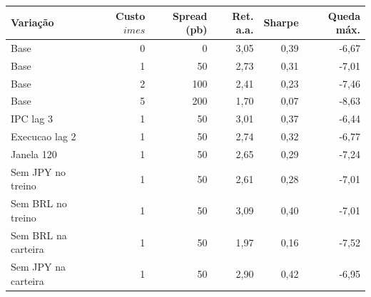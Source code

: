 \begin{tabular}{lrrrrr}
\toprule
Variação & Custo $	imes$ & Spread (pb) & Ret. a.a. & Sharpe & Queda máx. \\
\midrule
Base & 0 & 0 & 3,05 & 0,39 & -6,67 \\
Base & 1 & 50 & 2,73 & 0,31 & -7,01 \\
Base & 2 & 100 & 2,41 & 0,23 & -7,46 \\
Base & 5 & 200 & 1,70 & 0,07 & -8,63 \\
IPC lag 3 & 1 & 50 & 3,01 & 0,37 & -6,44 \\
Execucao lag 2 & 1 & 50 & 2,74 & 0,32 & -6,77 \\
Janela 120 & 1 & 50 & 2,65 & 0,29 & -7,24 \\
Sem JPY no treino & 1 & 50 & 2,61 & 0,28 & -7,01 \\
Sem BRL no treino & 1 & 50 & 3,09 & 0,40 & -7,01 \\
Sem BRL na carteira & 1 & 50 & 1,97 & 0,16 & -7,52 \\
Sem JPY na carteira & 1 & 50 & 2,90 & 0,42 & -6,95 \\
\bottomrule
\end{tabular}